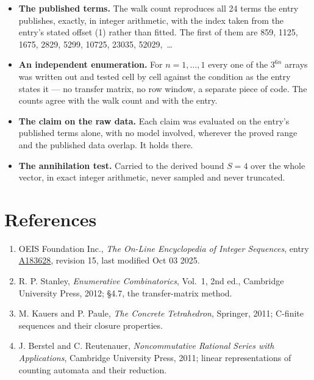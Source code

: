 \documentclass[11pt]{article}
\theoremstyle{definition}
\begin{document}
\begin{itemize}

\item {\bfseries The published terms.} The walk count reproduces all 24 terms the entry publishes, exactly, in integer arithmetic, with the index taken from the entry's stated offset (1) rather than fitted. The first of them are 859, 1125, 1675, 2829, 5299, 10725, 23035, 52029,~\dots

\item {\bfseries An independent enumeration.} For $n = 1,\dots,1$ every one of the $3^{6n}$ arrays was written out and tested cell by cell against the condition as the entry states it --- no transfer matrix, no row window, a separate piece of code. The counts agree with the walk count and with the entry.

\item {\bfseries The claim on the raw data.} Each claim was evaluated on the entry's published terms alone, with no model involved, wherever the proved range and the published data overlap. It holds there.

\item {\bfseries The annihilation test.} Carried to the derived bound $S = 4$ over the whole vector, in exact integer arithmetic, never sampled and never truncated.

\end{itemize}

\section{References}

\begin{enumerate}

\item OEIS Foundation Inc., \emph{The On-Line Encyclopedia of Integer Sequences}, entry \href{https://oeis.org/A183628}{A183628}, revision 15, last modified Oct 03 2025.

\item R. P. Stanley, \emph{Enumerative Combinatorics}, Vol.~1, 2nd ed., Cambridge University Press, 2012; \S4.7, the transfer-matrix method.

\item M. Kauers and P. Paule, \emph{The Concrete Tetrahedron}, Springer, 2011; C-finite sequences and their closure properties.

\item J. Berstel and C. Reutenauer, \emph{Noncommutative Rational Series with Applications}, Cambridge University Press, 2011; linear representations of counting automata and their reduction.

\end{enumerate}
\end{document}
